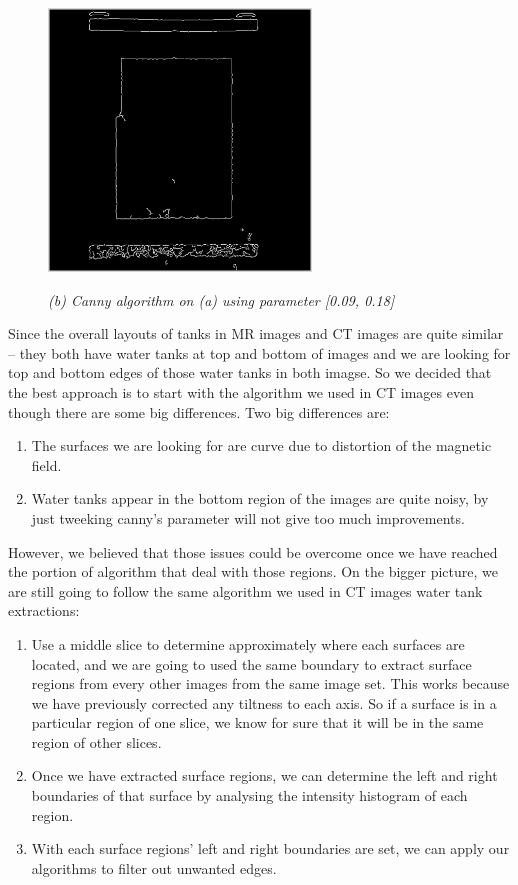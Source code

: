 \begin{figure}[htb]
  \begin{minipage}[t]{2.75in}
    \centering
    \centerline{\mbox{\includegraphics[width=2.75in]{data_extraction/images/MRI/mid_slice/112_canny_[0.09,0.18].eps}}}
    \centerline{\emph{(b) Canny algorithm on (a) using parameter [0.09, 0.18]}}
  \end{minipage}


\end{figure}


Since the overall layouts of tanks in MR images and CT images are quite similar -- they both have water tanks
at top and bottom of images and we are looking for top and bottom edges of those water tanks in both imagse.
So we decided that the best approach is to start with the algorithm we used in CT images even though there
are some big differences. Two big differences are:

\begin{enumerate}
  \item The surfaces we are looking for are curve due to distortion of the magnetic field.
  \item Water tanks appear in the bottom region of the images are quite noisy, by just tweeking canny's
    parameter will not give too much improvements.
\end{enumerate}

However, we believed that those issues could be overcome once we have reached the portion of algorithm that 
deal with those regions. On the bigger picture, we are still going to follow the same algorithm we used in
CT images water tank extractions:

\begin{enumerate}
  \item Use a middle slice to determine approximately where each surfaces are located, and we are going to
    used the same boundary to extract surface regions from every other images from the same image set. This 
    works because we have previously corrected any tiltness to each axis. So if a surface is in a particular
    region of one slice, we know for sure that it will be in the same region of other slices.
  \item Once we have extracted surface regions, we can determine the left and right boundaries of that surface
    by analysing the intensity histogram of each region.
  \item With each surface regions' left and right boundaries are set, we can apply our algorithms to filter out
    unwanted edges.
\end{enumerate}

